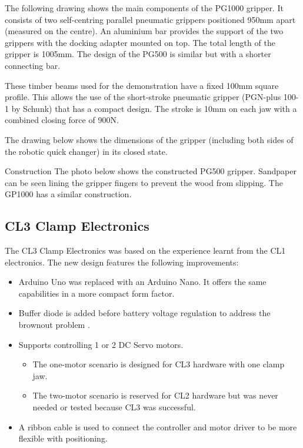 The following drawing shows the main components of the PG1000 gripper. It consists of two self-centring parallel pneumatic grippers positioned 950mm apart (measured on the centre). An aluminium bar provides the support of the two grippers with the docking adapter mounted on top. The total length of the gripper is 1005mm. The design of the PG500 is similar but with a shorter connecting bar. 

These timber beams used for the demonstration have a fixed 100mm square profile. This allows the use of the short-stroke pneumatic gripper (PGN-plus 100-1 by Schunk) that has a compact design. The stroke is 10mm on each jaw with a combined closing force of 900N. 

The drawing below shows the dimensions of the gripper (including both sides of the robotic quick changer) in its closed state. 

Construction
The photo below shows the constructed PG500 gripper. Sandpaper can be seen lining the gripper fingers to prevent the wood from slipping. The GP1000 has a similar construction. 

\subsection{CL3 Clamp Electronics}
\label{subsection:exploration-2-cl3-clamp-electronics}

The CL3 Clamp Electronics was based on the experience learnt from the CL1 electronics. The new design features the following improvements:
\begin{itemize}
    \item Arduino Uno was replaced with an Arduino Nano. It offers the same capabilities in a more compact form factor.
    \item Buffer diode is added before battery voltage regulation to address the brownout problem .
    \item Supports controlling 1 or 2 DC Servo motors. 
    \begin{itemize}
        \item The one-motor scenario is designed for CL3 hardware with one clamp jaw. 
        \item The two-motor scenario is reserved for CL2 hardware but was never needed or tested because CL3 was successful.
    \end{itemize}
    \item A ribbon cable is used to connect the controller and motor driver to be more flexible with positioning.
\end{itemize}

